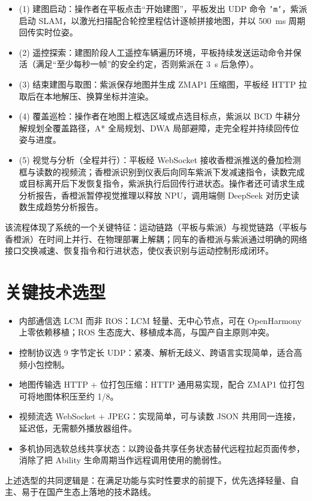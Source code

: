 \begin{itemize}
\item (1) 建图启动：操作者在平板点击“开始建图”，平板发出 UDP 命令 \texttt{'m'}，紫派启动 SLAM，以激光扫描配合轮控里程估计逐帧拼接地图，并以 500~ms 周期回传实时位姿。
\item (2) 遥控探索：建图阶段人工遥控车辆遍历环境，平板持续发送运动命令并保活（满足“至少每秒一帧”的安全约定，否则紫派在 3~s 后急停）。
\item (3) 结束建图与取图：紫派保存地图并生成 ZMAP1 压缩图，平板经 HTTP 拉取后在本地解压、换算坐标并渲染。
\item (4) 覆盖巡检：操作者在地图上框选区域或点选目标点，紫派以 BCD 牛耕分解规划全覆盖路径，A* 全局规划、DWA 局部避障，走完全程并持续回传位姿与进度。
\item (5) 视觉与分析（全程并行）：平板经 WebSocket 接收香橙派推送的叠加检测框与读数的视频流；香橙派识别到仪表后向同车紫派下发减速指令，读数完成或目标离开后下发恢复指令，紫派执行后回传行进状态。操作者还可请求生成分析报告，香橙派暂停视觉推理以释放 NPU，调用端侧 DeepSeek 对历史读数生成趋势分析报告。
\end{itemize}

该流程体现了系统的一个关键特征：运动链路（平板与紫派）与视觉链路（平板与香橙派）在时间上并行、在物理部署上解耦；同车的香橙派与紫派通过明确的网络接口交换减速、恢复指令和行进状态，使仪表识别与运动控制形成闭环。

\section{关键技术选型}
\label{sec:tech-choices}

\begin{itemize}
\item 内部通信选 LCM 而非 ROS：LCM 轻量、无中心节点，可在 OpenHarmony 上零依赖移植；ROS 生态庞大、移植成本高，与国产自主原则冲突。
\item 控制协议选 9 字节定长 UDP：紧凑、解析无歧义、跨语言实现简单，适合高频小包控制。
\item 地图传输选 HTTP + 位打包压缩：HTTP 通用易实现，配合 ZMAP1 位打包可将地图体积压至约 1/8。
\item 视频流选 WebSocket + JPEG：实现简单，可与读数 JSON 共用同一连接，延迟低，无需额外播放器组件。
\item 多机协同选软总线共享状态：以跨设备共享任务状态替代远程拉起页面传参，消除了把 Ability 生命周期当作远程调用使用的脆弱性。
\end{itemize}

上述选型的共同逻辑是：在满足功能与实时性要求的前提下，优先选择轻量、自主、易于在国产生态上落地的技术路线。
